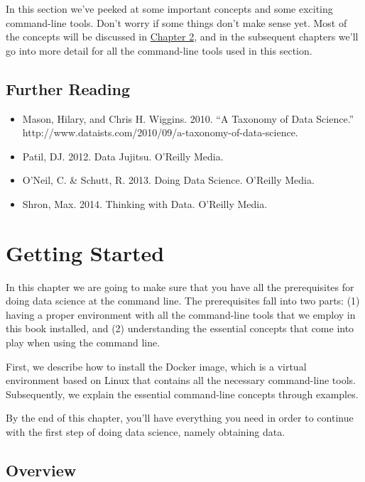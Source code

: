 \documentclass[
]{book}
\providecommand{\tightlist}{%
  \setlength{\itemsep}{0pt}\setlength{\parskip}{0pt}}
\theoremstyle{definition}
\theoremstyle{definition}
\theoremstyle{definition}
\theoremstyle{remark}
\begin{document}
In this section we've peeked at some important concepts and some exciting command-line tools. Don't worry if some things don't make sense yet. Most of the concepts will be discussed in \protect\hyperlink{chapter-2-getting-started}{Chapter 2}, and in the subsequent chapters we'll go into more detail for all the command-line tools used in this section.

\hypertarget{further-reading}{%
\section{Further Reading}\label{further-reading}}

\begin{itemize}
\tightlist
\item
  Mason, Hilary, and Chris H. Wiggins. 2010. ``A Taxonomy of Data Science.'' http://www.dataists.com/2010/09/a-taxonomy-of-data-science.
\item
  Patil, DJ. 2012. Data Jujitsu. O'Reilly Media.
\item
  O'Neil, C. \& Schutt, R. 2013. Doing Data Science. O'Reilly Media.
\item
  Shron, Max. 2014. Thinking with Data. O'Reilly Media.
\end{itemize}

\hypertarget{chapter-2-getting-started}{%
\chapter{Getting Started}\label{chapter-2-getting-started}}

In this chapter we are going to make sure that you have all the prerequisites for doing data science at the command line. The prerequisites fall into two parts: (1) having a proper environment with all the command-line tools that we employ in this book installed, and (2) understanding the essential concepts that come into play when using the command line.

First, we describe how to install the Docker image, which is a virtual environment based on Linux that contains all the necessary command-line tools. Subsequently, we explain the essential command-line concepts through examples.

By the end of this chapter, you'll have everything you need in order to continue with the first step of doing data science, namely obtaining data.

\hypertarget{overview}{%
\section{Overview}\label{overview}}
\end{document}
